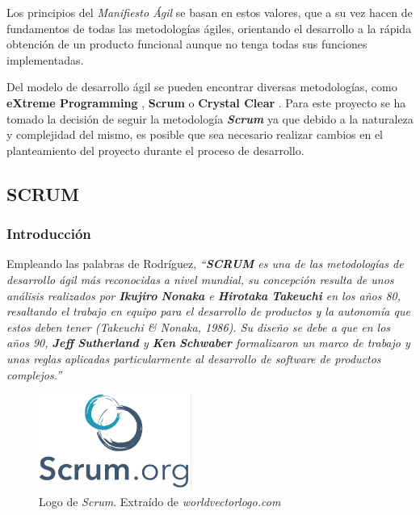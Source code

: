 Los principios del \textit{Manifiesto Ágil} se basan en estos valores, que a su vez hacen de fundamentos de 
todas las metodologías ágiles, orientando el desarrollo a la rápida obtención de un producto funcional 
aunque no tenga todas sus funciones implementadas. \medskip

Del modelo de desarrollo ágil se pueden encontrar diversas metodologías, como \textbf{eXtreme Programming} \autocite*{Stephens2003},
\textbf{Scrum} \autocite*{Schwaber2011} o \textbf{Crystal Clear} \autocite*{Cockburn2004}. 
Para este proyecto se ha tomado la decisión de seguir la metodología \textit{\textbf{Scrum}} ya que debido a la naturaleza y complejidad del mismo, 
es posible que sea necesario realizar cambios en el planteamiento del proyecto durante el proceso de desarrollo. \medskip

\subsection{SCRUM}
\subsubsection{Introducción}
Empleando las palabras de Rodríguez, \textit{“\textbf{SCRUM} es una de las metodologías de desarrollo ágil más reconocidas a nivel mundial, su concepción resulta de unos 
análisis realizados por \textbf{Ikujiro} \textbf{Nonaka} e \textbf{Hirotaka} \textbf{Takeuchi} en los años 80, resaltando el trabajo en equipo para el 
desarrollo de productos y la autonomía que estos deben tener (Takeuchi \& Nonaka, 1986). Su diseño se debe a que 
en los años 90, \textbf{Jeff} \textbf{Sutherland} y \textbf{Ken} \textbf{Schwaber} formalizaron un marco de trabajo y unas reglas aplicadas 
particularmente al desarrollo de software de productos complejos.”} \autocite*{Rodriguez} \medskip 

\begin{figure}[H]
    \centering
    \includegraphics[width=5cm]{Images/Logo_Scrum.jpeg}
    \caption{Logo de \textit{Scrum}. Extraído de \textit{worldvectorlogo.com} \autocite*{ScrumLogo}}
\end{figure}
\newpage
